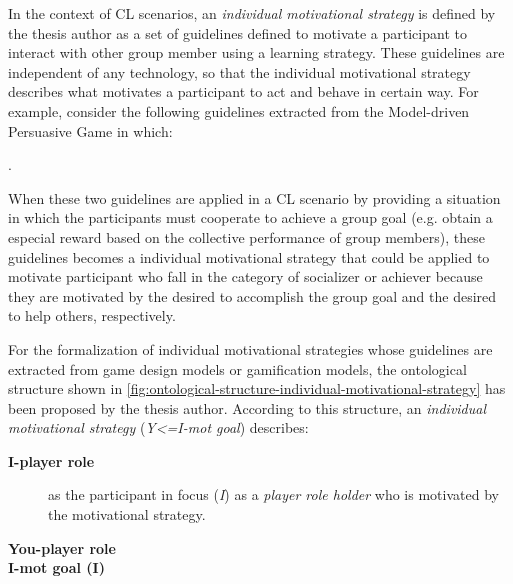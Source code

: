 In the context of CL scenarios, an \emph{individual motivational strategy} is defined by the thesis author as a set of guidelines defined to motivate a participant to interact with other group member using a learning strategy. These guidelines are independent of any technology, so that the individual motivational strategy describes what motivates a participant to act and behave in certain way. For example, consider the following guidelines extracted from the Model-driven Persuasive Game in which:

\begin{citation}
 .
\end{citation}

When these two guidelines are applied in a CL scenario by providing a situation in which the participants must cooperate to achieve a group goal (e.g. obtain a especial reward based on the collective performance of group members), these guidelines becomes a individual motivational strategy that could be applied to motivate participant who fall in the category of socializer or achiever because they are motivated by the desired to accomplish the group goal and the desired to help others, respectively.

For the formalization of individual motivational strategies whose guidelines are extracted from game design models or gamification models, the ontological structure shown in \autoref{fig:ontological-structure-individual-motivational-strategy} has been proposed by the thesis author. According to this structure, an \emph{individual motivational strategy} (\emph{Y<=I-mot goal}) describes:

\begin{description}
\item[\textbf{I-player role}]
as the participant in focus (\emph{I}) as a \emph{player role holder} who is motivated by the motivational strategy.

\item[\textbf{You-player role}]


\item[\textbf{I-mot goal (I)}]

\end{description}

